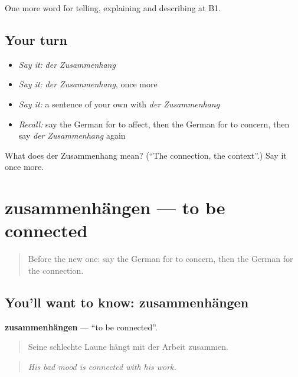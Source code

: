 \begin{grammarlens}[title={What you've built}]
One more word for telling, explaining and describing at B1.
\end{grammarlens}

\subsection*{Your turn}
\begin{itemize}
\raggedright
  \item \emph{Say it:} \emph{der Zusammenhang}
  \item \emph{Say it:} \emph{der Zusammenhang}, once more
  \item \emph{Say it:} a sentence of your own with \emph{der Zusammenhang}
  \item \emph{Recall:} say the German for to affect, then the German for to concern, then say \emph{der Zusammenhang} again
\end{itemize}

\begin{tcolorbox}[breakable,colback=teal!4,colframe=teal!35!black,title={Before you move on}]
What does der Zusammenhang mean? (\textquotedblleft{}The connection, the context\textquotedblright{}.) Say it once more.
\end{tcolorbox}
\section[zusammenhängen]{zusammenhängen — to be connected}

\label{lesson:GE-C345-zusammenhaengen}



\begin{quote}
Before the new one: say the German for to concern, then the German for the connection.
\end{quote}

\subsection*{You'll want to know: zusammenhängen}
\textbf{zusammenhängen} — \textquotedblleft{}to be connected\textquotedblright{}.

\begin{quote}
Seine schlechte Laune hängt mit der Arbeit zusammen.
\end{quote}

\begin{quote}
\emph{His bad mood is connected with his work.}
\end{quote}

